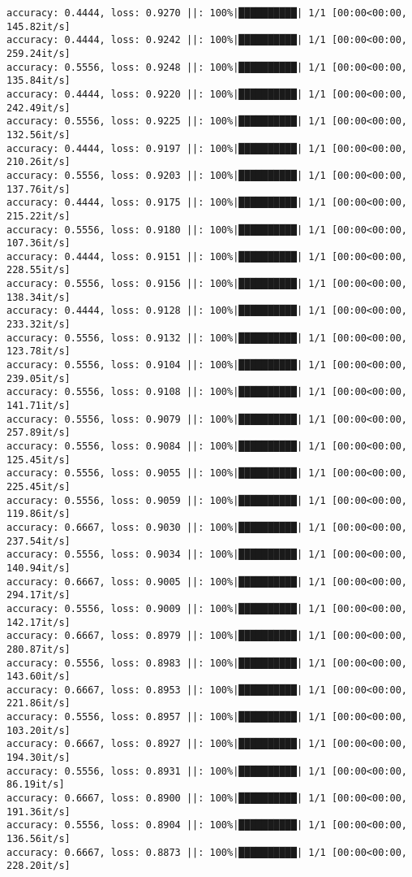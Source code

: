 \documentclass[
]{article}
\begin{document}
\begin{verbatim}
accuracy: 0.4444, loss: 0.9270 ||: 100%|██████████| 1/1 [00:00<00:00, 145.82it/s]
accuracy: 0.4444, loss: 0.9242 ||: 100%|██████████| 1/1 [00:00<00:00, 259.24it/s]
accuracy: 0.5556, loss: 0.9248 ||: 100%|██████████| 1/1 [00:00<00:00, 135.84it/s]
accuracy: 0.4444, loss: 0.9220 ||: 100%|██████████| 1/1 [00:00<00:00, 242.49it/s]
accuracy: 0.5556, loss: 0.9225 ||: 100%|██████████| 1/1 [00:00<00:00, 132.56it/s]
accuracy: 0.4444, loss: 0.9197 ||: 100%|██████████| 1/1 [00:00<00:00, 210.26it/s]
accuracy: 0.5556, loss: 0.9203 ||: 100%|██████████| 1/1 [00:00<00:00, 137.76it/s]
accuracy: 0.4444, loss: 0.9175 ||: 100%|██████████| 1/1 [00:00<00:00, 215.22it/s]
accuracy: 0.5556, loss: 0.9180 ||: 100%|██████████| 1/1 [00:00<00:00, 107.36it/s]
accuracy: 0.4444, loss: 0.9151 ||: 100%|██████████| 1/1 [00:00<00:00, 228.55it/s]
accuracy: 0.5556, loss: 0.9156 ||: 100%|██████████| 1/1 [00:00<00:00, 138.34it/s]
accuracy: 0.4444, loss: 0.9128 ||: 100%|██████████| 1/1 [00:00<00:00, 233.32it/s]
accuracy: 0.5556, loss: 0.9132 ||: 100%|██████████| 1/1 [00:00<00:00, 123.78it/s]
accuracy: 0.5556, loss: 0.9104 ||: 100%|██████████| 1/1 [00:00<00:00, 239.05it/s]
accuracy: 0.5556, loss: 0.9108 ||: 100%|██████████| 1/1 [00:00<00:00, 141.71it/s]
accuracy: 0.5556, loss: 0.9079 ||: 100%|██████████| 1/1 [00:00<00:00, 257.89it/s]
accuracy: 0.5556, loss: 0.9084 ||: 100%|██████████| 1/1 [00:00<00:00, 125.45it/s]
accuracy: 0.5556, loss: 0.9055 ||: 100%|██████████| 1/1 [00:00<00:00, 225.45it/s]
accuracy: 0.5556, loss: 0.9059 ||: 100%|██████████| 1/1 [00:00<00:00, 119.86it/s]
accuracy: 0.6667, loss: 0.9030 ||: 100%|██████████| 1/1 [00:00<00:00, 237.54it/s]
accuracy: 0.5556, loss: 0.9034 ||: 100%|██████████| 1/1 [00:00<00:00, 140.94it/s]
accuracy: 0.6667, loss: 0.9005 ||: 100%|██████████| 1/1 [00:00<00:00, 294.17it/s]
accuracy: 0.5556, loss: 0.9009 ||: 100%|██████████| 1/1 [00:00<00:00, 142.17it/s]
accuracy: 0.6667, loss: 0.8979 ||: 100%|██████████| 1/1 [00:00<00:00, 280.87it/s]
accuracy: 0.5556, loss: 0.8983 ||: 100%|██████████| 1/1 [00:00<00:00, 143.60it/s]
accuracy: 0.6667, loss: 0.8953 ||: 100%|██████████| 1/1 [00:00<00:00, 221.86it/s]
accuracy: 0.5556, loss: 0.8957 ||: 100%|██████████| 1/1 [00:00<00:00, 103.20it/s]
accuracy: 0.6667, loss: 0.8927 ||: 100%|██████████| 1/1 [00:00<00:00, 194.30it/s]
accuracy: 0.5556, loss: 0.8931 ||: 100%|██████████| 1/1 [00:00<00:00, 86.19it/s]
accuracy: 0.6667, loss: 0.8900 ||: 100%|██████████| 1/1 [00:00<00:00, 191.36it/s]
accuracy: 0.5556, loss: 0.8904 ||: 100%|██████████| 1/1 [00:00<00:00, 136.56it/s]
accuracy: 0.6667, loss: 0.8873 ||: 100%|██████████| 1/1 [00:00<00:00, 228.20it/s]

\end{verbatim}
\end{document}
